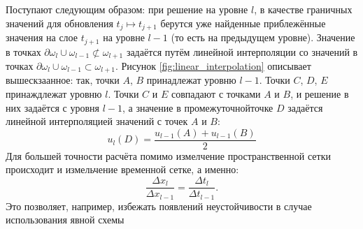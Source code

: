 Поступают следующим образом: при решение на уровне $l$, в качестве граничных значений для обновления $t_j \mapsto t_{j + 1}$ берутся уже найденные приблежённые значения на слое $t_{j + 1}$ на уровне $l - 1$ (то есть на предыдущем уровне).
Значение в точках $\partial \omega_l \cup \omega_{l - 1} \not\subset \omega_{l + 1}$ задаётся путём линейной интерполяции со значений в точках $\partial \omega_l \cup \omega_{l - 1} \subset \omega_{l + 1}$.
Рисунок \ref{fig:linear_interpolation} описывает вышескзаанное:
так, точки $A$, $B$ принадлежат уровню $l - 1$.
Точки $C$, $D$, $E$ принаждлежат уровню $l$.
Точки $C$ и $E$ совпадают с точками $A$ и $B$, и решение в них задаётся с уровня $l - 1$, а значение в \glqq промежуточной\grqq точке $D$ задаётся линейной интерполяцией значений с точек $A$ и $B$:
\begin{equation*}
    u_l(D) = \frac{u_{l - 1}(A) + u_{l - 1}(B)}{2}
\end{equation*}
Для большей точности расчёта помимо измелчение пространственной сетки происходит и измельчение временной сетке, а именно:
\begin{equation*}
    \frac{\Delta x_{l}}{\Delta x_{l - 1}} = \frac{\Delta t_{l}}{\Delta t_{l - 1}}.
\end{equation*}
Это позволяет, например, избежать появлений неустойчивости в случае использования явной схемы